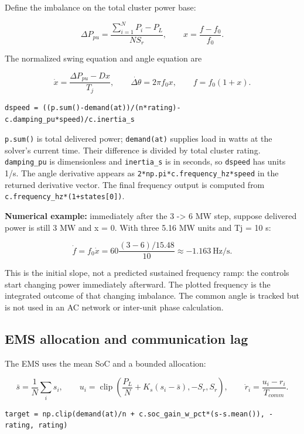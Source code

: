 \documentclass[11pt,a4paper]{article}
\begin{document}
Define the imbalance on the total cluster power base:

\[
\Delta P_{pu}=\frac{\sum_{i=1}^{N}P_i-P_L}{N S_r},\qquad
x=\frac{f-f_0}{f_0}.
\]

The normalized swing equation and angle equation are

\[
\dot x=\frac{\Delta P_{pu}-D x}{T_j},\qquad
\dot{\Delta\theta}=2\pi f_0x,\qquad f=f_0(1+x).
\]

\begin{lstlisting}
dspeed = ((p.sum()-demand(at))/(n*rating)-c.damping_pu*speed)/c.inertia_s
\end{lstlisting}

\texttt{p.sum()} is total delivered power; \texttt{demand(at)} supplies load in watts at the solver's current time. Their difference is divided by total cluster rating. \texttt{damping\_pu} is dimensionless and \texttt{inertia\_s} is in seconds, so \texttt{dspeed} has units 1/s. The angle derivative appears as \texttt{2*np.pi*c.frequency\_hz*speed} in the returned derivative vector. The final frequency output is computed from \texttt{c.frequency\_hz*(1+states[0])}.

\textbf{Numerical example:} immediately after the 3  ->  6 MW step, suppose delivered power is still 3 MW and x = 0. With three 5.16 MW units and Tj = 10 s:

\[
\dot f=f_0\dot x=60\frac{(3-6)/15.48}{10}\approx-1.163\ \mathrm{Hz/s}.
\]

This is the initial slope, not a predicted sustained frequency ramp: the controls start changing power immediately afterward. The plotted frequency is the integrated outcome of that changing imbalance. The common angle is tracked but is not used in an AC network or inter-unit phase calculation.

\subsection{EMS allocation and communication lag}

The EMS uses the mean SoC and a bounded allocation:

\[
\bar s=\frac{1}{N}\sum_i s_i,\qquad
u_i=\operatorname{clip}\left(\frac{P_L}{N}+K_s(s_i-\bar s),-S_r,S_r\right),
\qquad \dot r_i=\frac{u_i-r_i}{T_{comm}}.
\]

\begin{lstlisting}
target = np.clip(demand(at)/n + c.soc_gain_w_pct*(s-s.mean()), -rating, rating)
\end{lstlisting}
\end{document}
